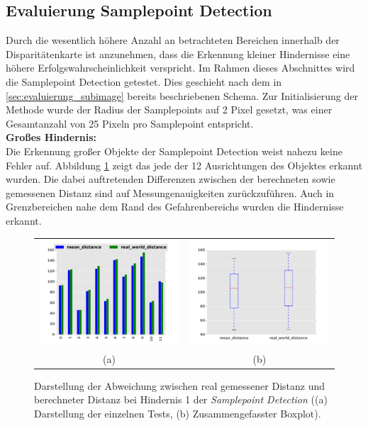 \subsection{Evaluierung Samplepoint Detection}
\label{sec:evaluierung_samplepoint}

\noindent
Durch die wesentlich höhere Anzahl an betrachteten Bereichen innerhalb der Disparitätenkarte ist anzunehmen, dass die Erkennung kleiner Hindernisse eine höhere Erfolgswahrscheinlichkeit verspricht. Im Rahmen dieses Abschnittes wird die Samplepoint Detection getestet. Dies geschieht nach dem in \ref{sec:evaluierung_subimage} bereits beschriebenen Schema. Zur Initialisierung der Methode wurde der Radius der Samplepoints auf 2 Pixel gesetzt, was einer Gesamtanzahl von 25 Pixeln pro Samplepoint entspricht.\\

\noindent
\textbf{Großes Hindernis:}\\
Die Erkennung großer Objekte der Samplepoint Detection weist nahezu keine Fehler auf. Abbildung \ref{fig:sample_eval_big} zeigt das jede der 12 Ausrichtungen des Objektes erkannt wurden. Die dabei auftretenden Differenzen zwischen der berechneten sowie gemessenen Distanz sind auf Messungenauigkeiten zurückzuführen. Auch in Grenzbereichen nahe dem Rand des Gefahrenbereichs wurden die Hindernisse erkannt.\\

\begin{figure}[h]
	\centering
	\begin{tabular}{cc}
	\includegraphics[width=7cm]{img/evaluation/diagrams/sample_big_bar}&
	\includegraphics[width=7cm]{img/evaluation/diagrams/sample_big_box}\\
	 (a) & (b)
	\end{tabular}
	\caption{Darstellung der Abweichung zwischen real gemessener Distanz und berechneter Distanz bei Hindernis 1 der \emph{Samplepoint Detection} ((a) Darstellung der einzelnen Tests, (b) Zusammengefasster Boxplot).}
    \label{fig:sample_eval_big}
\end{figure}

